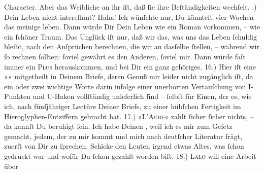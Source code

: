 \begin{ledgroupsized}[t]{13cm}
               Character. Aber das Weibliche an ihr iſt, daß ſie ihre Beſtändigkeiten wechſelt.\pend
           .) Dein Leben nicht intereſſant? Haha! Ich wünſchte nur, Du könnteſt vier Wochen
               das  meinige leben. {\pb}Dann würde  Dir Dein Leben wie ein Roman
               vorkommen, – wie ein ſchöner Traum. Das Unglück iſt nur, daß \strikeout{\textcolor{gray}{m}} wir das, was uns das Leben ſchuldig bleibt, nach den Anſprüchen berechnen, die
                  \uline{wir} an dasſelbe ſtellen, – während wir ſo rechnen
               ſollten: ſoviel gewährt es den Anderen, ſoviel mir. Dann würde faſt immer ein \textsc{Plus} herauskommen, und bei Dir ein ganz gehöriges.\pend
           \pstart
           {\pb}16.) Hier iſt eine »\label{K_L02774-77v}\label{K_L02774-77h}« mitgetheilt in Deinem Briefe, deren Genuß mir leider nicht zugänglich iſt,
               da ein oder zwei wichtige Worte darin infolge einer unerhörten Vertauſchung von
               I-Punkten und U-Haken vollſtändig unleſerlich ſind – ſelbſt für Einen, der  es, wie ich, nach fünfjähriger Lectüre
               Deiner Briefe, zu einer hübſchen Fertigkeit im Hieroglyphen-Entziffern gebracht
               hat.\pend
           \pstart
           {\pb}17.) »\textsc{L’Aube}« zahlt ſicher ſicher nichts, – da kannſt Du beruhigt ſein. Ich habe Deinen
                  \label{K_L02774-34v}\label{K_L02774-34h}, weil ich es mir zum Geſetz \strikeout{\textcolor{gray}{ma}} gemacht, jedem, der zu mir kommt und mich nach deutſcher Literatur frägt,
               zuerſt von Dir zu ſprechen. Schicke den Leuten irgend etwas Altes, was ſchon gedruckt war und wofür
               Du ſchon gezahlt worden biſt.\pend
           \pstart
           {\pb}18.) \textsc{Lalo} will eine Arbeit über \label{K_L02774-35v}
\end{ledgroupsized}
